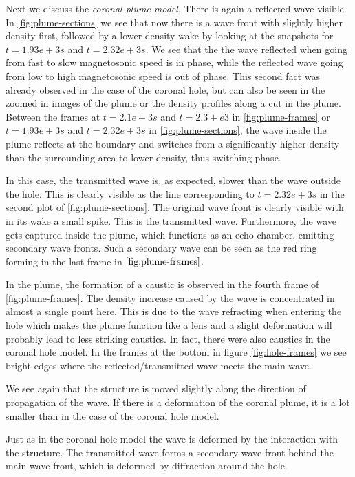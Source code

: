 Next we discuss the \emph{coronal plume model}. There is again a reflected wave visible.
In \cref{fig:plume-sections} we see that now there is a wave front with slightly higher density first, followed by a lower density wake by looking at the snapshots for $t=1.93e+3 s$ and $t=2.32e+3 s$.
We see that the the wave reflected when going from fast to slow magnetosonic speed is in phase, while the reflected wave going from low to high magnetosonic speed is out of phase.
This second fact was already observed in the case of the coronal hole, but can also be seen in the zoomed in images of the plume or the density profiles along a cut in the plume.
Between the frames at $t=2.1e+3 s$ and $t=2.3+e3$ in \cref{fig:plume-frames}  or $t=1.93e+3 s$ and $t=2.32e+3 s$ in \cref{fig:plume-sections}, the wave inside the plume reflects at the boundary and switches from a significantly higher density than the surrounding area to lower density, thus switching phase.

In this case, the transmitted wave is, as expected, slower than the wave outside the hole.
This is clearly visible as the line corresponding to $t=2.32e+3 s$ in the second plot of \cref{fig:plume-sections}.
The original wave front is clearly visible with in its wake a small spike. This is the transmitted wave.
Furthermore, the wave gets captured inside the plume, which functions as an echo chamber, emitting secondary wave fronts.
Such a secondary wave can be seen as the red ring forming in the last frame in $\cref{fig:plume-frames}$.

In the plume, the formation of a caustic is observed in the fourth frame of \cref{fig:plume-frames}. 
The density increase caused by the wave is concentrated in almost a single point here. 
This is due to the wave refracting when entering the hole which makes the plume function like a lens and a slight deformation will probably lead to less striking caustics.
In fact, there were also caustics in the coronal hole model.
In the frames at the bottom in figure \cref{fig:hole-frames} we see bright edges where the reflected/transmitted wave meets the main wave.

We see again that the structure is moved slightly along the direction of propagation of the wave. 
If there is a deformation of the coronal plume, it is a lot smaller than in the case of the coronal hole model.

Just as in the coronal hole model the wave is deformed by the interaction with the structure.
The transmitted wave forms a secondary wave front behind the main wave front, which is deformed by diffraction around the hole.
